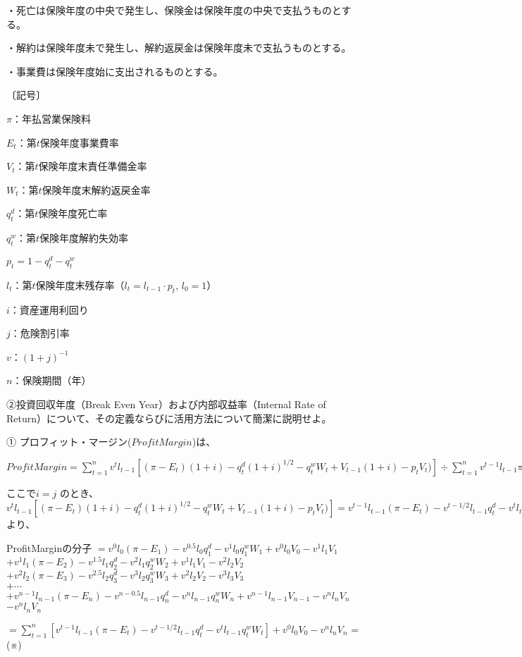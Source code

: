 \documentclass[report,gutter=10mm,fore-edge=10mm,uplatex,dvipdfmx]{jlreq}
\begin{document}
・死亡は保険年度の中央で発生し、保険金は保険年度の中央で支払うものとする。

・解約は保険年度未で発生し、解約返戻金は保険年度未で支払うものとする。

・事業費は保険年度始に支出されるものとする。

〔記号〕

$\pi$：年払営業保険料

$E_t$：第$t$保険年度事業費率

$V_t$：第$t$保険年度末責任準備金率

$W_t$：第$t$保険年度末解約返戻金率

$q_t^d$：第$t$保険年度死亡率

$q_t^w$：第$t$保険年度解約失効率

$p_t = 1  - q_t^d - q_t^w$

$l_t$：第$t$保険年度末残存率（$l_t=l_{t-1}\cdot p_t$, $l_0=1$）

$i$：資産運用利回り

$j$：危険割引率

$v$：$(1+j)^{-1}$

$n$：保険期間（年）

②投資回収年度（Break Even Year）および内部収益率（Internal Rate of Return）について、その定義ならびに活用方法について簡潔に説明せよ。
\answer{}

①
プロフィット・マージン($ProfitMargin$)は、

$ProfitMargin = \sum^n_{t=1} v^t l_{t-1}[(\pi-E_t)(1+i)-q_t^d(1+i)^{1/2}-q_t^wW_t+V_{t-1}(1+i)-p_tV_t)]\div \sum^n_{t=1}v^{t-1}l_{t-1}\pi$

ここで$i=j$ のとき、
$v^t l_{t-1}[(\pi-E_t)(1+i)-q_t^d(1+i)^{1/2}-q_t^wW_t+V_{t-1}(1+i)-p_tV_t)]
= v^{t-1}l_{t-1}(\pi-E_t) - v^{t-1/2}l_{t-1}q_t^d - v^tl_{t-1}q_t^w W_t + v^{t-1}l_{t-1}V_{t-1} - v^tl_tV_t$
より、

ProfitMarginの分子
$=v^0l_0(\pi-E_1)-v^{0.5}l_0q_1^d - v^1l_0q_1^wW_1 + v^0l_0V_0 - v^1l_1V_1$\\
$+v^1l_1(\pi-E_2)-v^{1.5}l_1q_2^d - v^2l_1q_2^wW_2 + v^1l_1V_1 - v^2l_2V_2$\\
$+v^2l_2(\pi-E_3)-v^{2.5}l_2q_3^d - v^3l_2q_3^wW_3 + v^2l_2V_2 - v^3l_3V_3$\\
$+\cdots$\\
$+v^{n-1}l_{n-1}(\pi-E_{n})-v^{n-0.5}l_{n-1}q_{n}^d - v^{n}l_{n-1}q_{n}^wW_{n} + v^{n-1}l_{n-1}V_{n-1} - v^{n}l_{n}V_{n}$
$-v^nl_nV_n$

$= \sum^n_{t=1}[v^{t-1}l_{t-1}(\pi-E_t)-v^{t-1/2}l_{t-1}q_t^d-v^tl_{t-1}q_t^wW_t] + v^0l_0V_0 - v^nl_nV_n$  = (※)
\end{document}
